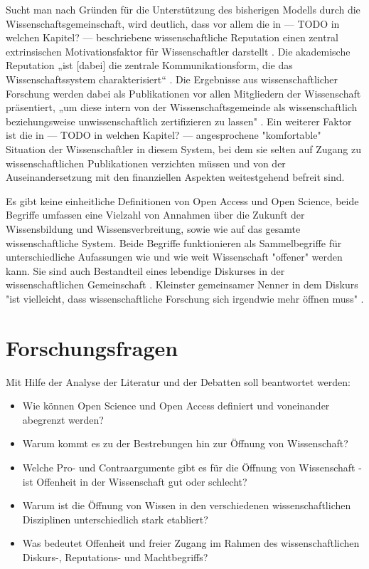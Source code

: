 Sucht man nach Gründen für die Unterstützung des bisherigen Modells durch die Wissenschaftsgemeinschaft, wird deutlich, dass vor allem die in --- TODO in welchen Kapitel? --- beschriebene wissenschaftliche Reputation einen zentral extrinsischen Motivationsfaktor für Wissenschaftler darstellt \cite{minssen_2012_arbeit}. Die akademische Reputation „ist [dabei] die zentrale Kommunikationsform, die das Wissenschaftssystem charakterisiert“ \cite{Rutenfranz_1997}. Die Ergebnisse aus wissenschaftlicher Forschung werden dabei als Publikationen vor allen Mitgliedern der Wissenschaft präsentiert, „um diese intern von der Wissenschaftsgemeinde als wissenschaftlich beziehungsweise unwissenschaftlich zertifizieren zu lassen" \cite{Rutenfranz_1997}. Ein weiterer Faktor ist die in --- TODO in welchen Kapitel? --- angesprochene "komfortable" Situation der Wissenschaftler in diesem System, bei dem sie selten auf Zugang zu wissenschaftlichen Publikationen verzichten müssen und von der Auseinandersetzung mit den finanziellen Aspekten weitestgehend befreit sind.

Es gibt keine einheitliche Definitionen von Open Access und Open Science, beide Begriffe umfassen eine Vielzahl von Annahmen über die Zukunft der Wissensbildung und Wissensverbreitung, sowie wie auf das gesamte wissenschaftliche System. Beide Begriffe funktionieren als Sammelbegriffe für unterschiedliche Aufassungen wie und wie weit Wissenschaft "offener" werden kann. Sie sind auch Bestandteil eines lebendige Diskurses in der wissenschaftlichen Gemeinschaft \cite{schulze_2013_open}. Kleinster gemeinsamer Nenner in dem Diskurs "ist vielleicht, dass wissenschaftliche Forschung sich irgendwie mehr öffnen muss" \cite{cite:9}.

\section{Forschungsfragen} 

Mit Hilfe der Analyse der Literatur und der Debatten soll beantwortet werden: 
\begin{itemize}
\item Wie können Open Science und Open Access definiert und voneinander abegrenzt werden? 
\item Warum kommt es zu der Bestrebungen hin zur Öffnung von Wissenschaft? 
\item Welche Pro- und Contraargumente gibt es für die Öffnung von Wissenschaft - ist Offenheit in der Wissenschaft gut oder schlecht? 
\item Warum ist die Öffnung von Wissen in den verschiedenen wissenschaftlichen Disziplinen unterschiedlich stark etabliert? 
\item Was bedeutet Offenheit und freier Zugang im Rahmen des wissenschaftlichen Diskurs-, Reputations- und Machtbegriffs?
\end{itemize}	

